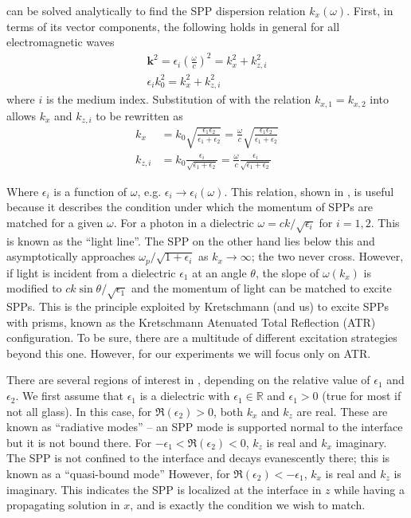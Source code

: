  can be solved analytically to find the SPP
dispersion relation $k_x(\omega)$.
First, in terms of its vector components, the following holds in general
for all electromagnetic waves
\begin{align}
\mathbf{k}^2=\epsilon_i \left(\frac{\omega}{c}\right)^2=k_x^2 + k_{z,i}^2\\
\epsilon_i k_0^2=k_x^2 + k_{z,i}^2
\label{eqn:dispersion1}
\end{align}
where $i$ is the medium index.
Substitution of  with the relation 
$k_{x,1}=k_{x,2}$ into  allows 
$k_x$ and $k_{z,i}$ to be rewritten as
\begin{align}
k_x &= k_0\sqrt{\frac{\epsilon_1 \epsilon_2}{\epsilon_1+\epsilon_2}} 
= \frac{\omega}{c}\sqrt{\frac{\epsilon_1 \epsilon_2}{\epsilon_1+\epsilon_2}}\\
k_{z,i} &= k_0\frac{\epsilon_i}{\sqrt{\epsilon_1+\epsilon_2}}
= \frac{\omega}{c}\frac{\epsilon_i}{\sqrt{\epsilon_1+\epsilon_2}}
\end{align}

Where $\epsilon_i$ is a function of $\omega$, e.g.
$\epsilon_i\to\epsilon_i(\omega)$.  This relation, shown in
, is useful because it describes the
condition under which the momentum of SPPs are matched for a given
$\omega$.  For a photon in a dielectric $\omega = c k /\sqrt{\epsilon_i}$
for $i=1,2$.  This is known as the ``light line''.  The SPP on the other
hand lies below this and asymptotically approaches
$\omega_p/\sqrt{1+\epsilon_i}$ as $k_x\to\infty$; the two never cross.
However, if light is incident from a dielectric $\epsilon_1$ at an angle
$\theta$, the slope of $\omega(k_x)$ is modified to $c k \sin
\theta/\sqrt{\epsilon_1}$ and the momentum of light can be matched to
excite SPPs.  This is the principle exploited by Kretschmann
\cite{kretschmann1968} (and us) to excite SPPs with prisms, known as the
Kretschmann Atenuated Total Reflection (ATR) configuration.  To be sure,
there are a multitude of different excitation strategies beyond this one.
However, for our experiments we will focus only on ATR.

There are several regions of interest in ,
depending on the relative value of $\epsilon_1$ and $\epsilon_2$.  We first
assume that $\epsilon_1$ is a dielectric with $\epsilon_1\in\mathbb{R}$ and
$\epsilon_1 > 0$ (true for most if not all glass).  In this case, for
$\Re(\epsilon_2)>0$, both $k_x$ and $k_z$ are real.  These are known as
``radiative modes'' -- an SPP mode is supported normal to the interface but
it is not bound there.  For $-\epsilon_1<\Re(\epsilon_2)<0$, $k_z$ is real
and $k_x$ imaginary.  The SPP is not confined to the interface and decays
evanescently there; this is known as a ``quasi-bound mode''  However, for
$\Re(\epsilon_2)<-\epsilon_1$, $k_x$ is real and $k_z$ is imaginary.  This
indicates the SPP is localized at the interface in $z$ while having a
propagating solution in $x$, and is exactly the condition we wish to match.


